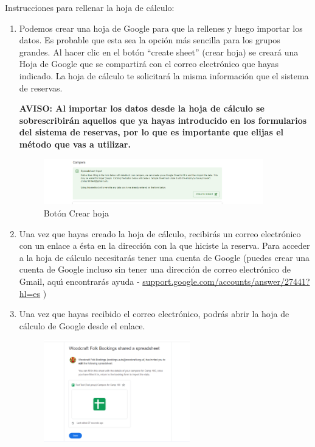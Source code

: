 \documentclass[a4paper, 11pt]{report}
\begin{document}
\begin{enumerate}
    Instrucciones para rellenar la hoja de c\'alculo:
    \begin{enumerate}
        \item Podemos crear una hoja de Google para que la rellenes y luego importar los datos. Es probable que esta sea la opci\'on m\'as sencilla para los grupos grandes. Al hacer clic en el bot\'on ``create sheet'' (crear hoja) se crear\'a una Hoja de Google que se compartir\'a con el correo electr\'onico que hayas indicado. La hoja de c\'alculo te solicitar\'a la misma informaci\'on que el sistema de reservas.  
        
        \textbf{AVISO: Al importar los datos desde la hoja de c\'alculo se sobrescribir\'an aquellos que ya hayas introducido en los formularios del sistema de reservas, por lo que es importante que elijas el m\'etodo que vas a utilizar.}
        \begin{figure}[H]
            \centering
            \includegraphics[width=0.9\textwidth]{assets/2-spreadsheet-option.png}
            \caption{Bot\'on Crear hoja}
        \end{figure}
        \item Una vez que hayas creado la hoja de c\'alculo, recibir\'as un correo electr\'onico con un enlace a \'esta en la direcci\'on con la que hiciste la reserva. Para acceder a la hoja de c\'alculo necesitar\'as tener una cuenta de Google (puedes crear una cuenta de Google incluso sin tener una direcci\'on de correo electr\'onico de Gmail, aqu\'{\i} encontrar\'as ayuda - \href{https://support.google.com/accounts/answer/27441?hl=es}{support.google.com/accounts/answer/27441?hl=es} ) 
        \item Una vez que hayas recibido el correo electr\'onico, podr\'as abrir la hoja de c\'alculo de Google desde el enlace.
         \begin{figure}[H]
            \centering
            \includegraphics[width=0.6\textwidth]{assets/2-spreadsheet-email.png}

\end{figure}
\end{enumerate}
\end{enumerate}
\end{document}

